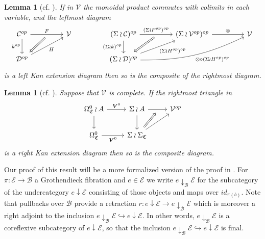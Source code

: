 \documentclass[a4paper,10pt
,draft
]{article}%
\numberwithin{equation}{section}
\numberwithin{figure}{section}
\newtheorem{lemma}[equation]{Lemma}%
\theoremstyle{definition} %
\newcommand{\1}{\ensuremath{\mathbbm 1}}%
\begin{document}
\begin{lemma}[{cf. \cite[Lemma 2.21]{BP_geo}}]
\label{FINWRPRODLIM LEM}
If in $\mathcal{V}$ the monoidal product %
commutes with colimits in each variable, and the leftmost diagram
\begin{equation}\label{WRLAN EQ}
	\begin{tikzcd}[column sep = 4.5em]
	\mathcal{C}^{op} \ar{r}[swap,name=F]{}{F} \ar{d}[swap]{k^{op}} & 
	\mathcal{V} & 
	(\Sigma \wr \mathcal{C})^{op} \ar{d}[swap]{(\Sigma \wr k)^{op}} 
	\ar{r}[swap,name=FF]{}{(\Sigma \wr F^{op})^{op}} & 
	(\Sigma \wr \mathcal{V}^{op})^{op} \ar{r}{\otimes} &
	\mathcal{V}
\\
	|[alias=D]|\mathcal{D}^{op} \ar{ru}[swap]{H} &
	& 
	|[alias=FD]|(\Sigma \wr \mathcal{D})^{op} 
	\ar{ru}[swap]{(\Sigma \wr H^{op})^{op}}
	\ar[bend right=13]{rru}[swap]{\otimes \circ (\Sigma \wr H^{op})^{op}}
	&
	\arrow[Leftarrow, from=D, to=F,shorten <=0.10cm]%
	\arrow[Leftarrow, from=FD, to=FF,shorten <=0.10cm]
	\end{tikzcd}
\end{equation}
is a left Kan extension diagram then so is the composite of the rightmost diagram. 
\end{lemma}




\begin{lemma}[{cf. \cite[Lemma 4.28]{BP_geo}}]
	\label{LANPULLCOMA LEM}
	Suppose that $\mathcal{V}$ is complete. If the rightmost triangle in 
\[
\begin{tikzcd}
	\Omega_{\mathfrak{C}}^{0} \wr A \ar{r}{\boldsymbol{V}^0} 
	\ar{d} & 
	\Sigma \wr A  
	\ar{d}  \ar{r}[swap,name=F]{}&
	\mathcal{V}^{op}
\\
	\Omega_{\mathfrak{C}}^{0} \ar{r}[swap]{\boldsymbol{V}^0} & 
	|[alias=FEG]|\Sigma \wr \Sigma_{\mathfrak{C}} \ar{ru}
\arrow[Rightarrow, from=FEG, to=F,shorten <=0.15cm]
\end{tikzcd}
\]
is a right Kan extension diagram then so is the composite diagram.
\end{lemma}



Our proof of this result will be a more formalized version of the proof in \cite[Lemma 4.28]{BP_geo}.
For 
$\pi \colon \mathcal{E} \to \mathcal{B}$
a Grothendieck fibration and $e \in \mathcal{E}$
we write
$e \downarrow_{\mathcal{B}} \mathcal{E}$
for the subcategory of the undercategory
$e \downarrow \mathcal{E}$
consisting of those objects and maps
over $id_{\pi(b)}$.
Note that pullbacks over $\mathcal{B}$
provide a retraction 
$r \colon e \downarrow \mathcal{E} \to
e \downarrow_{\mathcal{B}} \mathcal{E}$
which is moreover a right adjoint
to the inclusion
$e \downarrow_{\mathcal{B}} \mathcal{E} 
\hookrightarrow
e \downarrow \mathcal{E}$.
In other words, 
$e \downarrow_{\mathcal{B}} \mathcal{E} $
is a coreflexive subcategory of 
$e \downarrow \mathcal{E} $,
so that the inclusion
$e \downarrow_{\mathcal{B}} \mathcal{E} 
\hookrightarrow
e \downarrow \mathcal{E}$
is final.
\end{document}
